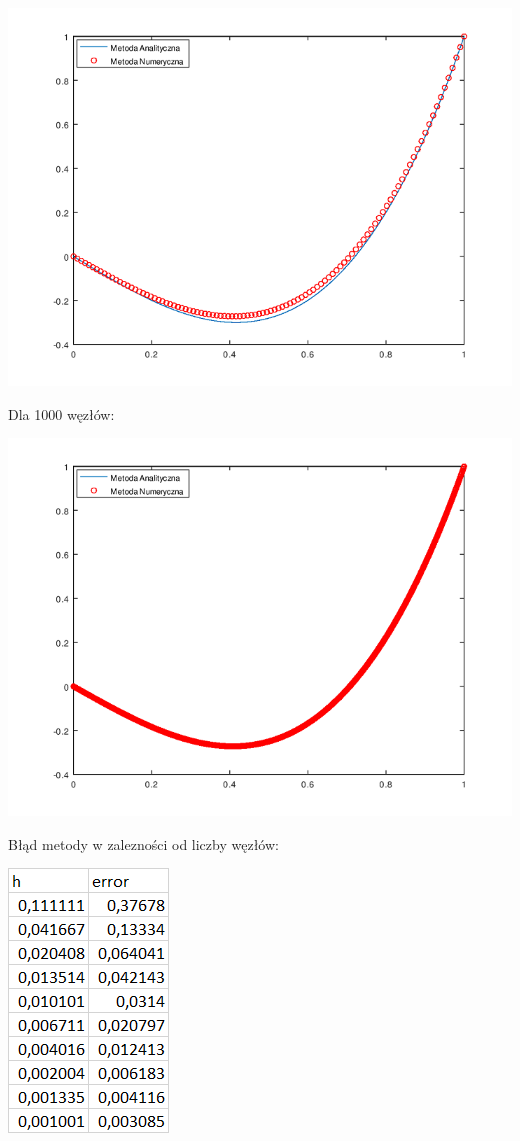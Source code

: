 {\centering

\includegraphics{Lab3/charts/zad2/lab_3_2_n_100.png}

}

Dla 1000 węzłów:

{\centering

\includegraphics{Lab3/charts/zad2/lab_3_2_n_1000.png}

}

\newpage

Błąd metody w zalezności od liczby węzłów:

\includegraphics{Lab3/charts/zad2/error_dane.png}


